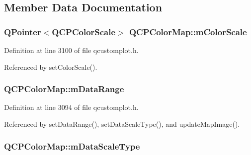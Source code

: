 \subsection{Member Data Documentation}
\hypertarget{class_q_c_p_color_map_a95b4100bacc3387652c988b071ec9db7}{}
\subsubsection[{m\+Color\+Scale}]{\setlength{\rightskip}{0pt plus 5cm}Q\+Pointer$<${\bf Q\+C\+P\+Color\+Scale}$>$ Q\+C\+P\+Color\+Map\+::m\+Color\+Scale\hspace{0.3cm}{\ttfamily [protected]}}\label{class_q_c_p_color_map_a95b4100bacc3387652c988b071ec9db7}


Definition at line 3100 of file qcustomplot.\+h.



Referenced by set\+Color\+Scale().

\hypertarget{class_q_c_p_color_map_ab87609621d16cd3e9d52ad070b327b08}{}
\subsubsection[{m\+Data\+Range}]{ Q\+C\+P\+Color\+Map\+::m\+Data\+Range\hspace{0.3cm}{\ttfamily [protected]}}\label{class_q_c_p_color_map_ab87609621d16cd3e9d52ad070b327b08}


Definition at line 3094 of file qcustomplot.\+h.



Referenced by set\+Data\+Range(), set\+Data\+Scale\+Type(), and update\+Map\+Image().

\hypertarget{class_q_c_p_color_map_ab28a4b2def408f83b9818799d5f18446}{}
\subsubsection[{m\+Data\+Scale\+Type}]{ Q\+C\+P\+Color\+Map\+::m\+Data\+Scale\+Type\hspace{0.3cm}{\ttfamily [protected]}}\label{class_q_c_p_color_map_ab28a4b2def408f83b9818799d5f18446}


